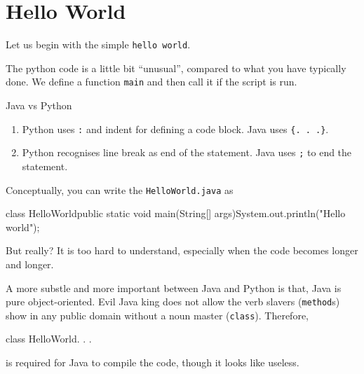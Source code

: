 \documentclass[a4paper]{article}
\newcommand{\pythonfile}[1]{}
\newcommand{\javafile}[1]{}
\begin{document}
 
\section{Hello World} 
Let us begin with the simple \verb|hello world|.
\pythonfile{../code/helloworld.py}
The python code is a little bit ``unusual'', compared to what you have typically done.  We define a function \verb|main| and then call it if the script is run. 

\javafile{../code/HelloWorld.java}

Java vs Python
\begin{enumerate}
    \item Python uses \verb|:| and indent for defining a code block. Java uses \verb|{. . .}|.
    \item Python recognises line break as end of the statement. Java uses \verb|;| to end the statement.
\end{enumerate}
Conceptually, you can write the \verb|HelloWorld.java| as
\begin{jcode}
class HelloWorld{public static void main(String[] args){System.out.println("Hello world");}}
\end{jcode}
But really? It is too hard to understand, especially when the code becomes longer and longer.

A more substle and more important between Java and Python is that, Java is pure object-oriented. Evil Java king does not allow the verb slavers (\verb|method|s) show in any public domain without a noun master (\verb|class|). Therefore, 
\begin{jcode}
class HelloWorld{. . .
}
\end{jcode}
is required for Java to compile the code, though it looks like useless.


\end{document}
